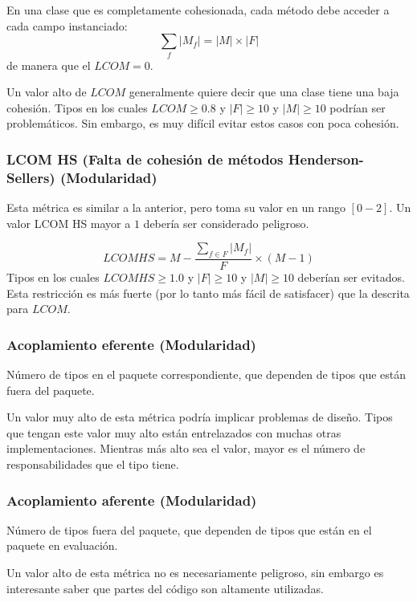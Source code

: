 En una clase que es completamente cohesionada, cada método debe acceder a cada campo instanciado:
\begin{equation*}
\sum_f \left|M_f\right| = \left|M\right|\times\left|F\right|
\end{equation*}
de manera que el $LCOM=0$.

Un valor alto de $LCOM$ generalmente quiere decir que una clase tiene una baja cohesión. Tipos en los cuales
$LCOM\ge 0.8$ y $\left|F\right|\ge 10$ y $\left|M\right|\ge 10$ podrían ser problemáticos. Sin embargo, es 
muy difícil evitar estos casos con poca cohesión.

\subsubsection{LCOM HS (Falta de cohesión de métodos Henderson-Sellers) (Modularidad)}
Esta métrica es similar a la anterior, pero toma su valor en un rango $\left[ 0-2\right]$. Un valor LCOM 
HS mayor a $1$ debería ser considerado peligroso.

\begin{equation*}
LCOM HS = M - \frac{\sum_{f\in F}\left|M_f\right|}{F}\times (M-1)
\end{equation*}
Tipos en los cuales $LCOM HS\ge 1.0$ y $\left|F\right|\ge 10$ y $\left|M\right|\ge 10$ deberían ser evitados.
Esta restricción es más fuerte (por lo tanto más fácil de satisfacer) que la descrita para $LCOM$.

\subsubsection{Acoplamiento eferente (Modularidad)}
Número de tipos en el paquete correspondiente, que dependen de tipos que están fuera del paquete.

Un valor muy alto de esta métrica podría implicar problemas de diseño. Tipos que tengan este valor muy
alto están entrelazados con muchas otras implementaciones. Mientras más alto sea el valor, mayor es el número
de responsabilidades que el tipo tiene.

\subsubsection{Acoplamiento aferente (Modularidad)}
Número de tipos fuera del paquete, que dependen de tipos que están en el paquete en evaluación.

Un valor alto de esta métrica no es necesariamente peligroso, sin embargo es interesante saber que partes 
del código son altamente utilizadas.

